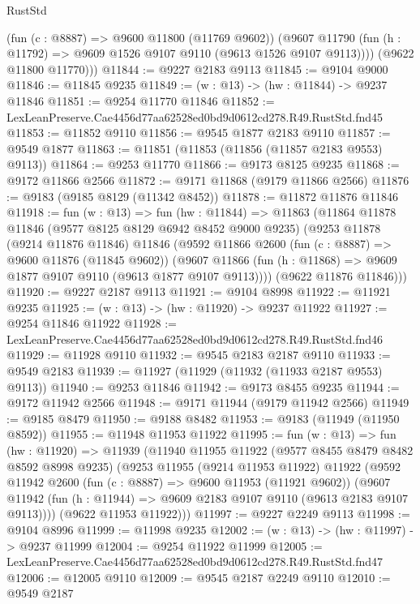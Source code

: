 \begin{lexlean}{RustStd}
\begin{coremodule}
          (fun (c : @8887) => @9600 @11800 (@11769 @9602))
          (@9607 @11790 (fun (h : @11792) => @9609 @1526 @9107 @9110 (@9613 @1526 @9107 @9113))))
        (@9622 @11800 @11770)))
@11844 := @9227 @2183 @9113
@11845 := @9104 @9000
@11846 := @11845 @9235
@11849 := (w : @13) -> (hw : @11844) -> @9237 @11846
@11851 := @9254 @11770 @11846
@11852 := LexLeanPreserve.Cae4456d77aa62528ed0bd9d0612cd278.R49.RustStd.fnd45
@11853 := @11852 @9110
@11856 := @9545 @1877 @2183 @9110
@11857 := @9549 @1877
@11863 := @11851 (@11853 (@11856 (@11857 @2183 @9553) @9113))
@11864 := @9253 @11770
@11866 := @9173 @8125 @9235
@11868 := @9172 @11866 @2566
@11872 := @9171 @11868 (@9179 @11866 @2566)
@11876 := @9183 (@9185 @8129 (@11342 @8452))
@11878 := @11872 @11876 @11846
@11918 := fun (w : @13) =>
  fun (hw : @11844) =>
  @11863
    (@11864
      @11878
      @11846
      (@9577 @8125 @8129 @6942 @8452 @9000 @9235)
      (@9253
        @11878
        (@9214 @11876 @11846)
        @11846
        (@9592
          @11866
          @2600
          (fun (c : @8887) => @9600 @11876 (@11845 @9602))
          (@9607 @11866 (fun (h : @11868) => @9609 @1877 @9107 @9110 (@9613 @1877 @9107 @9113))))
        (@9622 @11876 @11846)))
@11920 := @9227 @2187 @9113
@11921 := @9104 @8998
@11922 := @11921 @9235
@11925 := (w : @13) -> (hw : @11920) -> @9237 @11922
@11927 := @9254 @11846 @11922
@11928 := LexLeanPreserve.Cae4456d77aa62528ed0bd9d0612cd278.R49.RustStd.fnd46
@11929 := @11928 @9110
@11932 := @9545 @2183 @2187 @9110
@11933 := @9549 @2183
@11939 := @11927 (@11929 (@11932 (@11933 @2187 @9553) @9113))
@11940 := @9253 @11846
@11942 := @9173 @8455 @9235
@11944 := @9172 @11942 @2566
@11948 := @9171 @11944 (@9179 @11942 @2566)
@11949 := @9185 @8479
@11950 := @9188 @8482
@11953 := @9183 (@11949 (@11950 @8592))
@11955 := @11948 @11953 @11922
@11995 := fun (w : @13) =>
  fun (hw : @11920) =>
  @11939
    (@11940
      @11955
      @11922
      (@9577 @8455 @8479 @8482 @8592 @8998 @9235)
      (@9253
        @11955
        (@9214 @11953 @11922)
        @11922
        (@9592
          @11942
          @2600
          (fun (c : @8887) => @9600 @11953 (@11921 @9602))
          (@9607 @11942 (fun (h : @11944) => @9609 @2183 @9107 @9110 (@9613 @2183 @9107 @9113))))
        (@9622 @11953 @11922)))
@11997 := @9227 @2249 @9113
@11998 := @9104 @8996
@11999 := @11998 @9235
@12002 := (w : @13) -> (hw : @11997) -> @9237 @11999
@12004 := @9254 @11922 @11999
@12005 := LexLeanPreserve.Cae4456d77aa62528ed0bd9d0612cd278.R49.RustStd.fnd47
@12006 := @12005 @9110
@12009 := @9545 @2187 @2249 @9110
@12010 := @9549 @2187

\end{coremodule}
\end{lexlean}
